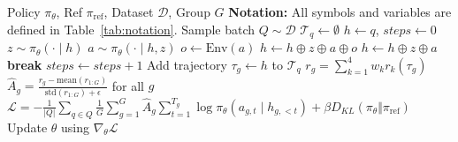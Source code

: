 \documentclass{article}
\theoremstyle{plain}
\theoremstyle{definition}
\theoremstyle{remark}
\begin{document}
\begin{algorithm}[t]
\small
\caption{Agentic GRPO with ReAct Sampling}
\label{alg:agentic_grpo}
\begin{algorithmic}[1]
\REQUIRE Policy $\pi_\theta$, Ref $\pi_{\mathrm{ref}}$, Dataset $\mathcal{D}$, Group $G$
\STATE \textbf{Notation:} All symbols and variables are defined in Table~\ref{tab:notation}.
    \STATE Sample batch $Q \sim \mathcal{D}$
        \STATE $\mathcal{T}_q \leftarrow \emptyset$
            \STATE $h \leftarrow q$, $steps \leftarrow 0$
                \STATE $z \sim \pi_\theta(\cdot \mid h)$
                \STATE $a \sim \pi_\theta(\cdot \mid h, z)$
                    \STATE $o \leftarrow \mathrm{Env}(a)$
                    \STATE $h \leftarrow h \oplus z \oplus a \oplus o$
                \ELSE
                    \STATE $h \leftarrow h \oplus z \oplus a$
                    \STATE \textbf{break}
                \ENDIF
                \STATE $steps \leftarrow steps + 1$
            \ENDWHILE
            \STATE Add trajectory $\tau_g \leftarrow h$ to $\mathcal{T}_q$
        \ENDFOR
            \STATE $r_g = \sum_{k=1}^{4} w_k r_k(\tau_g)$
        \ENDFOR
        \STATE $\hat{A}_g = \frac{r_g - \mathrm{mean}(r_{1:G})}{\mathrm{std}(r_{1:G}) + \epsilon}$ for all $g$
    \ENDFOR
    \STATE $\mathcal{L} = -\frac{1}{|Q|} \sum_{q \in Q} \frac{1}{G} \sum_{g=1}^{G} \hat{A}_g \sum_{t=1}^{T_g} \log \pi_\theta(a_{g,t}\mid h_{g,<t}) + \beta D_{KL}(\pi_\theta \Vert \pi_{\mathrm{ref}})$
    \STATE Update $\theta$ using $\nabla_\theta \mathcal{L}$
\ENDFOR
\end{algorithmic}
\end{algorithm}
\end{document}
